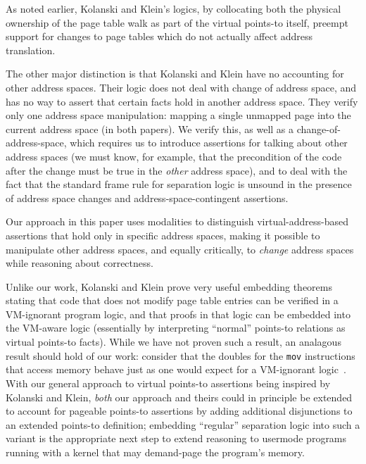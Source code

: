 As noted earlier, Kolanski and Klein's logics, by collocating both the physical ownership of the page table walk
as part of the virtual points-to itself, preempt support for changes to page tables which do not actually affect 
address translation.

The other major distinction is that Kolanski and Klein have no accounting for other address spaces.
Their logic does not deal with change of address space, and has no way to assert that certain facts hold
in another address space.
They verify only one address space manipulation: mapping a single unmapped page into the current address space (in both papers).
We verify this, as well as a change-of-address-space, which requires us to introduce assertions for talking
about other address spaces (we must know, for example, that the precondition of the code after the change must be true
in the \emph{other} address space), and to deal with the fact that the standard frame rule
for separation logic is unsound in the presence of address space changes and address-space-contingent assertions.

Our approach in this paper uses modalities to distinguish virtual-address-based assertions that hold only in specific 
address spaces, making it possible to manipulate other address spaces, and equally critically, to \emph{change} address 
spaces while reasoning about correctness. 

Unlike our work, Kolanski and Klein prove very useful embedding theorems stating that code that does not modify page table 
entries can be verified in a VM-ignorant program logic, and that proofs in that logic can be embedded into the VM-aware logic 
(essentially by interpreting ``normal'' points-to relations as virtual points-to facts). While we have not proven such a result,
an analagous result {should} hold of our work: consider that the doubles for the \texttt{mov} instructions
that access memory behave just as one would expect for a VM-ignorant logic~\cite{Chlipala2013Bedrock}.
With our general approach to virtual points-to assertions being inspired by Kolanski and Klein, \emph{both}
 our approach and theirs could in principle be extended to account for pageable points-to assertions by adding additional 
disjunctions to an extended points-to definition; embedding ``regular'' separation logic into such a variant
is the appropriate next step to extend reasoning to usermode programs running with a kernel that may demand-page the program's
memory.

